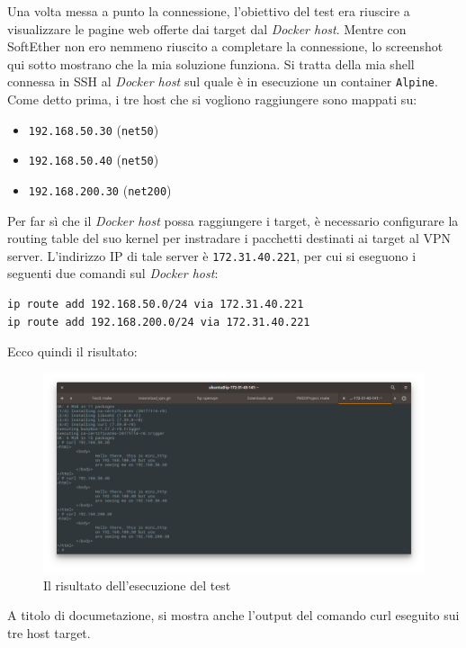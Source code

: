 Una volta messa a punto la connessione, l'obiettivo del test era riuscire a visualizzare
le pagine web offerte dai target dal \textit{Docker host}.
Mentre con SoftEther non ero nemmeno riuscito a completare la connessione, lo
screenshot qui sotto mostrano che la mia soluzione funziona. Si tratta della mia
shell connessa in SSH al \textit{Docker host} sul quale è in esecuzione un container
\texttt{Alpine}. Come detto prima, i tre host che si vogliono raggiungere sono
mappati su:
\begin{itemize}
  \item \texttt{192.168.50.30} (\texttt{net50})
  \item \texttt{192.168.50.40} (\texttt{net50})
  \item \texttt{192.168.200.30} (\texttt{net200})
\end{itemize}
Per far sì che il \textit{Docker host} possa raggiungere i target, è necessario
configurare la routing table del suo kernel per instradare i pacchetti destinati
ai target al VPN server. L'indirizzo IP di tale server è \texttt{172.31.40.221},
per cui si eseguono i seguenti due comandi sul \textit{Docker host}:
\begin{verbatim}
ip route add 192.168.50.0/24 via 172.31.40.221
ip route add 192.168.200.0/24 via 172.31.40.221
\end{verbatim}
Ecco quindi il risultato:
\begin{figure}[h]
  \includegraphics[scale=0.35]{img/test1-result}
  \caption{Il risultato dell'esecuzione del test}
  \label{fig:test1-result}
\end{figure}
A titolo di documetazione, si mostra anche l'output del comando curl eseguito
sui tre host target.
